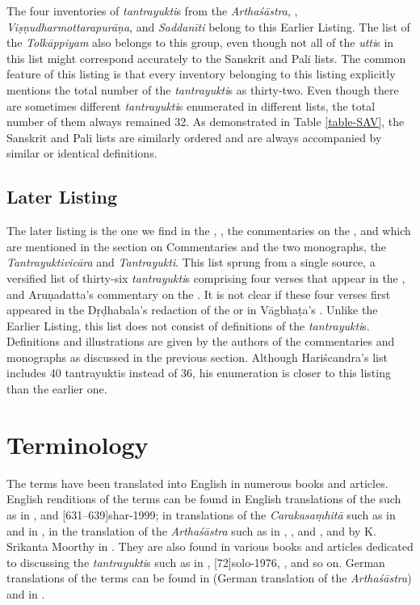 The four inventories of \emph{tantrayukti}s from the \emph{Arthaśāstra}, \SS, \emph{Viṣṇudharmottarapurāṇa}, and \emph{Saddanīti} belong to this Earlier Listing. The list of the \emph{Tolkāppiyam} also belongs to this group, even though not all of the \emph{utti}s in this list might correspond accurately to the Sanskrit and Pali lists. The common feature of this listing is that every inventory belonging to this listing explicitly mentions the total number of the \emph{tantrayukti}s as thirty-two. Even though there are sometimes different \emph{tantrayukti}s enumerated in different lists, the total number of them always remained 32. As demonstrated in Table \ref{table-SAV}, the Sanskrit and Pali lists are similarly ordered and are always accompanied by similar or identical definitions.

\subsection{Later Listing}

The later listing is the one we find in the \AS, \CS, the commentaries on the \CS, \AS and \AHS which are mentioned in the section on Commentaries and the two monographs, the \emph{Tantrayuktivicāra} and \emph{Tantrayukti}. This list sprung from a single source, a versified list of thirty-six \emph{tantrayukti}s comprising four verses that appear in the \AS, \CS and Aruṇadatta's commentary on the \AHS. It is not clear if these four verses first appeared in the Dṛḍhabala's redaction of the \CS or in Vāgbhaṭa's \AS. Unlike the Earlier Listing, this list does not consist of definitions of the \emph{tantrayukti}s. Definitions and illustrations are given by the authors of the commentaries and monographs as discussed in the previous section. Although Hariścandra's list includes 40 tantrayuktis instead of 36, his enumeration is closer to this listing than the earlier one. 

\section{Terminology}

\label{tantra-trans}
The terms have been translated into English in numerous books and articles. English renditions of the terms can be found in English translations of the \SS such as in \cite[171--172]{sing-1980}, and [631--639]{shar-1999}; in translations of the \emph{Carakasaṃhitā} such as in \cite[436--444]{shar-2006} and in \cite[1050]{gula-1949}, in the translation of the \emph{Arthaśāstra} such as in \cite[459]{sham-1951}, \cite[593]{kang-1969}, \cite[1103]{unni-2006} and \cite[]{oliv-2013}, and by K. Srikanta Moorthy in \cite[Appendix xi--xxxiv]{muth-1976}. They are also found in various books and articles dedicated to discussing the \emph{tantrayukti}s such as in \cite[601--602]{ober-1968}, [72]{solo-1976}, \cite[34--155]{lele-1981}, \citeyear[36--150]{lele-2006} and so on. German translations of the terms can be found in \cite[663--664]{meye-1926} (German translation of the \emph{Arthaśāstra}) and in \cite{pret-1991}.


